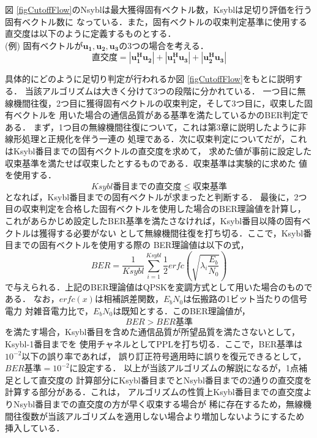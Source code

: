 図 \ref{figCutoffFlow}のNsyblは最大獲得固有ベクトル数，Ksyblは足切り評価を行う固有ベクトル数に
なっている．また，固有ベクトルの収束判定基準に使用する直交度は以下のように定義するものとする．\\
\vspace{5mm}
(例) \quad 固有ベクトルが$\bm{u_1,u_2,u_3}$の3つの場合を考える．
\begin{equation}
    直交度 = \left|\bm{u_1^Hu_2}\right|+\left|\bm{u_1^Hu_3}\right|+\left|\bm{u_2^Hu_3}\right|
\end{equation}

具体的にどのように足切り判定が行われるか図 \ref{figCutoffFlow}をもとに説明する．
当該アルゴリズムは大きく分けて3つの段階に分かれている．
一つ目に無線機間往復，2つ目に獲得固有ベクトルの収束判定，そして3つ目に，収束した固有ベクトルを
用いた場合の通信品質がある基準を満たしているかのBER判定である．
まず，1つ目の無線機間往復について，これは第3章に説明したように非線形処理と正規化を伴う一連の
処理である．次に収束判定についてだが，これはKsybl番目までの固有ベクトルの直交度を求めて，
求めた値が事前に設定した収束基準を満たせば収束したとするものである．収束基準は実験的に求めた
値を使用する．
\begin{equation}
    Ksybl番目までの直交度 \leq 収束基準
\end{equation}
となれば，Ksybl番目までの固有ベクトルが求まったと判断する．
最後に，2つ目の収束判定を合格した固有ベクトルを使用した場合のBER理論値を計算し，
これがあらかじめ設定したBER基準を満たさなければ，Ksybl番目以降の固有ベクトルは獲得する必要がない
として無線機間往復を打ち切る．ここで，Ksybl番目までの固有ベクトルを使用する際の
BER理論値は以下の式，
\begin{equation}
    BER = \frac{1}{Ksybl}\sum_{i=1}^{Ksybl} \frac{1}{2}erfc\left( \sqrt{\lambda_i\frac{E_b}{N_0}} \right)
\end{equation}
で与えられる．上記のBER理論値はQPSKを変調方式として用いた場合のものである．
 \cite{akaiwa}なお，$erfc(x)$は相補誤差関数，$E_bN_0$は伝搬路の1ビット当たりの信号電力
対雑音電力比で，$E_bN_0$は既知とする．このBER理論値が，
\begin{equation}
    BER > BER基準
\end{equation}
を満たす場合，Ksybl番目を含めた通信品質が所望品質を満たさないとして，Ksybl-1番目までを
使用チャネルとしてPPLを打ち切る．ここで，BER基準は$10^{-2}$以下の誤り率であれば，
誤り訂正符号適用時に誤りを復元できるとして，$BER基準=10^{-2}$に設定する．
以上が当該アルゴリズムの解説になるが，1点補足として直交度の
計算部分にKsybl番目までとNsybl番目までの2通りの直交度を計算する部分がある．これは，
アルゴリズムの性質上Ksybl番目までの直交度よりNsybl番目までの直交度の方が早く収束する場合が
稀に存在するため，無線機間往復数が当該アルゴリズムを適用しない場合より増加しないようにするため
挿入している．

